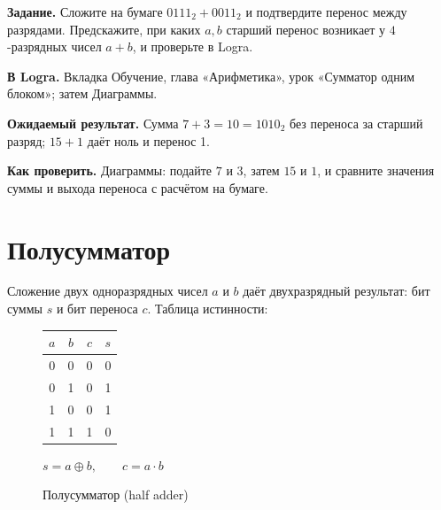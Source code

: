 \begin{diybox}
\textbf{Задание.}  Сложите на бумаге $0111_2+0011_2$ и подтвердите
перенос между разрядами.  Предскажите, при каких $a,b$ старший
перенос возникает у $4$-разрядных чисел $a+b$, и проверьте в Logra.

\textbf{В Logra.} Вкладка Обучение, глава «Арифметика», урок
«Сумматор одним блоком»; затем Диаграммы.

\textbf{Ожидаемый результат.} Сумма $7+3=10=1010_2$ без переноса за старший
разряд; $15+1$ даёт ноль и перенос 1.

\textbf{Как проверить.} Диаграммы: подайте $7$ и $3$, затем $15$ и $1$, и
сравните значения суммы и выхода переноса с расчётом на бумаге.
\end{diybox}

\section{Полусумматор}

Сложение двух одноразрядных чисел $a$ и $b$ даёт двухразрядный результат:
бит суммы $s$ и бит переноса $c$. Таблица истинности:

\begin{figure}[H]
\centering
\begin{minipage}{0.35\textwidth}
\centering
\begin{tabular}{cc|cc}
\toprule
$a$ & $b$ & $c$ & $s$ \\
\midrule
0 & 0 & 0 & 0 \\
0 & 1 & 0 & 1 \\
1 & 0 & 0 & 1 \\
1 & 1 & 1 & 0 \\
\bottomrule
\end{tabular}

\medskip
$s = a \oplus b, \qquad c = a\cdot b$
\end{minipage}
\begin{minipage}{0.55\textwidth}
\centering
{}
\end{minipage}
\caption{Полусумматор (half adder)}
\label{fig:ha}
\end{figure}

